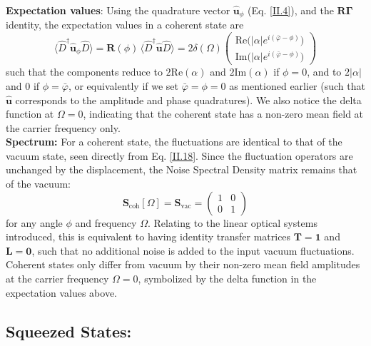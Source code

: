 \noindent \textbf{Expectation values}: Using the quadrature vector $\mathbf{\hat{u}}_\phi$ (Eq. \ref{II.4}), and the $\mathbf{R}\mathbf\Gamma$ identity, the expectation values in a coherent state are
\begin{equation}
\langle \hat{D}^\dagger\mathbf{\hat{\mathbf u}} _\phi \hat D\rangle
= \mathbf R(\phi)\,\langle \hat D^\dagger \mathbf{\hat{\mathbf u}} \hat D\rangle
=
2 \delta (\Omega)\begin{pmatrix}
\mathrm{Re}\big( |\alpha| e^{i(\bar{\varphi}-\phi)}\big) \\[2pt]
\mathrm{Im}\big(|\alpha| e^{i(\bar{\varphi}-\phi)}\big)
\end{pmatrix}
\label{eq:I.quad_unmod}
\end{equation}
such that the components reduce to $2\mathrm{Re} (\alpha)$ and  $2\mathrm{Im} (\alpha)$ if $\phi=0$, and to $2|\alpha|$ and $0$ if $\phi = \bar{\varphi}$, or equivalently if we set $\bar{\varphi} = \phi  = 0$ as mentioned earlier (such that $\mathbf{\hat u}$ corresponds to the amplitude and phase quadratures). We also notice the delta function at $\Omega = 0$, indicating that the coherent state has a non-zero mean field at the carrier frequency only. \\

\noindent \textbf{Spectrum:} For a coherent state, the fluctuations are identical to that of the vacuum state, seen directly from Eq. \ref{II.18}. Since the fluctuation operators are unchanged by the displacement, the Noise Spectral Density matrix remains that of the vacuum:
\begin{equation}
\mathbf{S}_{\text{coh}}[\Omega] = \mathbf{S}_{\text{vac}} = 
\begin{pmatrix}
1 & 0 \\
0 & 1
\end{pmatrix}
\end{equation}
for any angle $\phi$ and frequency $\Omega$. Relating to the linear optical systems introduced, this is equivalent to having identity transfer matrices $\mathbf{T} = \mathbf{1}$ and $\mathbf{L} = \mathbf{0}$, such that no additional noise is added to the input vacuum fluctuations. Coherent states only differ from vacuum by their non-zero mean field amplitudes at the carrier frequency $\Omega = 0$, symbolized by the delta function in the expectation values above.

\subsection*{Squeezed States:}

